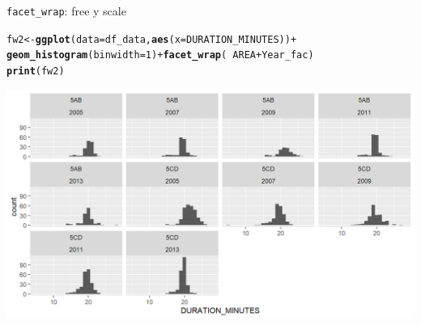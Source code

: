 \documentclass{beamer}\usepackage[]{graphicx}\usepackage[]{color}
\makeatletter
\newcommand{\hlnum}[1]{\textcolor[rgb]{0.686,0.059,0.569}{#1}}%
\newcommand{\hlopt}[1]{\textcolor[rgb]{0,0,0}{#1}}%
\newcommand{\hlstd}[1]{\textcolor[rgb]{0.345,0.345,0.345}{#1}}%
\newcommand{\hlkwb}[1]{\textcolor[rgb]{0.69,0.353,0.396}{#1}}%
\newcommand{\hlkwc}[1]{\textcolor[rgb]{0.333,0.667,0.333}{#1}}%
\newcommand{\hlkwd}[1]{\textcolor[rgb]{0.737,0.353,0.396}{\textbf{#1}}}%
\newenvironment{kframe}{%
 \def\at@end@of@kframe{}%
 \ifinner\ifhmode%
  \def\at@end@of@kframe{\end{minipage}}%
  \begin{minipage}{\columnwidth}%
 \fi\fi%
 \def\FrameCommand##1{\hskip\@totalleftmargin \hskip-\fboxsep
 \colorbox{shadecolor}{##1}\hskip-\fboxsep
     \hskip-\linewidth \hskip-\@totalleftmargin \hskip\columnwidth}%
 \MakeFramed {\advance\hsize-\width
   \@totalleftmargin\z@ \linewidth\hsize
   \@setminipage}}%
 {\par\unskip\endMakeFramed%
 \at@end@of@kframe}
\newenvironment{knitrout}{}{} %
\makeatother
\begin{document}
\begin{frame}[fragile]{\lstinline{facet_wrap}: free y scale}
\begin{knitrout}\footnotesize
{}\color{fgcolor}\begin{kframe}
\begin{alltt}
\hlstd{fw2} \hlkwb{<-} \hlkwd{ggplot}\hlstd{(}\hlkwc{data}\hlstd{=df_data,} \hlkwd{aes}\hlstd{(}\hlkwc{x}\hlstd{=DURATION_MINUTES))} \hlopt{+}
  \hlkwd{geom_histogram}\hlstd{(}\hlkwc{binwidth}\hlstd{=}\hlnum{1}\hlstd{)} \hlopt{+} \hlkwd{facet_wrap}\hlstd{(}\hlopt{~} \hlstd{AREA} \hlopt{+} \hlstd{Year_fac)}
\hlkwd{print}\hlstd{(fw2)}
\end{alltt}
\end{kframe}

{\centering \includegraphics[width=.9\linewidth]{figure/facet_wrap_5-1} 

}



\end{knitrout}
\end{frame}
\end{document}
